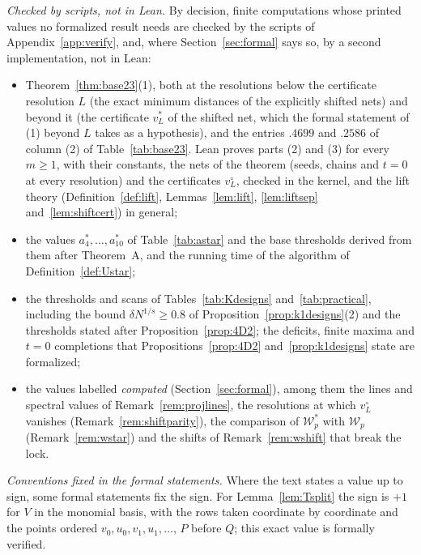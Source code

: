 \documentclass[11pt]{amsart}
\theoremstyle{definition}
\theoremstyle{plain}
\begin{document}
\emph{Checked by scripts, not in Lean.} By decision, finite computations whose printed values no formalized result needs are checked by the scripts of Appendix~\ref{app:verify}, and, where Section~\ref{sec:formal} says so, by a second implementation, not in Lean:
\begin{itemize}
\item Theorem~\ref{thm:base23}(1), both at the resolutions below the certificate resolution $L$ (the exact minimum distances of the explicitly shifted nets) and beyond it (the certificate $v^*_L$ of the shifted net, which the formal statement of (1) beyond $L$ takes as a hypothesis), and the entries $.4699$ and $.2586$ of column (2) of Table~\ref{tab:base23}. Lean proves parts (2) and (3) for every $m\ge1$, with their constants, the nets of the theorem (seeds, chains and $t=0$ at every resolution) and the certificates $v^\circ_L$, checked in the kernel, and the lift theory (Definition~\ref{def:lift}, Lemmas~\ref{lem:lift}, \ref{lem:liftsep} and~\ref{lem:shiftcert}) in general;
\item the values $a^*_4,\dots,a^*_{10}$ of Table~\ref{tab:astar} and the base thresholds derived from them after Theorem~A, and the running time of the algorithm of Definition~\ref{def:Ustar};
\item the thresholds and scans of Tables~\ref{tab:Kdesigns} and~\ref{tab:practical}, including the bound $\delta N^{1/s}\ge0.8$ of Proposition~\ref{prop:k1designs}(2) and the thresholds stated after Proposition~\ref{prop:4D2}; the deficits, finite maxima and $t=0$ completions that Propositions~\ref{prop:4D2} and~\ref{prop:k1designs} state are formalized;
\item the values labelled \emph{computed} (Section~\ref{sec:formal}), among them the lines and spectral values of Remark~\ref{rem:projlines}, the resolutions at which $v^\circ_L$ vanishes (Remark~\ref{rem:shiftparity}), the comparison of $\mathcal W^*_p$ with $\mathcal W_p$ (Remark~\ref{rem:wstar}) and the shifts of Remark~\ref{rem:wshift} that break the lock.
\end{itemize}

\emph{Conventions fixed in the formal statements.} Where the text states a value up to sign, some formal statements fix the sign. For Lemma~\ref{lem:Tsplit} the sign is $+1$ for $V$ in the monomial basis, with the rows taken coordinate by coordinate and the points ordered $v_0,u_0,v_1,u_1,\dots$, $P$ before $Q$; this exact value is formally verified.
\end{document}
